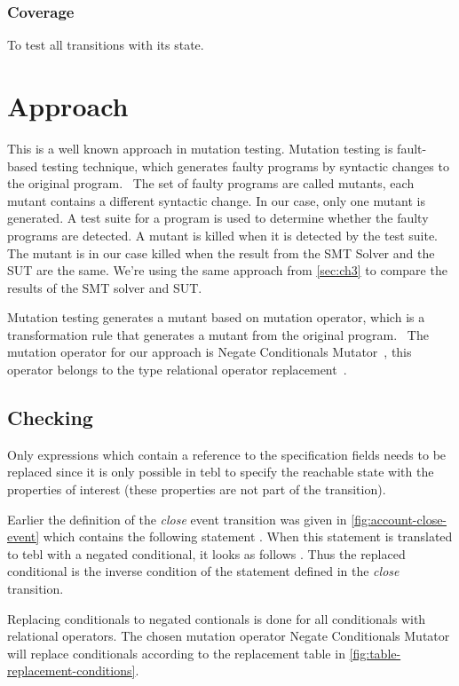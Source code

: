 \subsubsection{Coverage}
To test all transitions with its state.

\section{Approach}
This is a well known approach in mutation testing. Mutation testing is
fault-based testing technique, which generates faulty programs by syntactic
changes to the original program.~\cite[p.~1]{jia2011analysis} The set of faulty
programs are called mutants, each mutant contains a different syntactic change.
In our case, only one mutant is generated. A test suite for a program is used to
determine whether the faulty programs are detected. A mutant is killed when it
is detected by the test suite. The mutant is in our case killed when the result
from the SMT Solver and the SUT are the same. We're using the same
approach from \autoref{sec:ch3} to compare the results of the SMT solver and
SUT.

Mutation testing generates a mutant based on
mutation operator, which is a transformation rule that generates a mutant from
the original program.~\cite[p.~3-4]{jia2011analysis} The mutation operator for
our approach is Negate Conditionals Mutator~\cite{pitmutators}, this operator
belongs to the type relational operator
replacement~\cite[p.~688]{king1991fortran}.


\subsection{Checking}
Only expressions which contain a reference to the specification fields needs to
be replaced since it is only possible in tebl to specify the reachable state
with the properties of interest (these properties are not part of the
transition).

Earlier the definition of the \textit{close} event transition was given in
\autoref{fig:account-close-event} which contains the following statement
. When this statement is translated to tebl
with a negated conditional, it looks as follows
. Thus the replaced conditional is the inverse
condition of the statement defined in the \textit{close} transition.

Replacing conditionals to negated contionals is done for all conditionals with
relational operators. The chosen mutation operator Negate Conditionals Mutator
will replace conditionals according to the replacement table in
\autoref{fig:table-replacement-conditions}.

